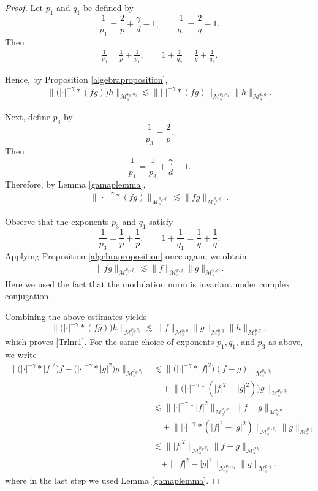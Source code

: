 \documentclass[12pt,reqno,a4paper]{amsart}
\numberwithin{equation}{section}
\theoremstyle{plain}
\theoremstyle{definition}
\theoremstyle{remark}
\def\M{\mathcal{M}}
\def \M{{\mathcal M}}
\begin{document}
\begin{proof}
Let $p_{1}$ and $q_{1}$ be defined by
\[
\frac{1}{p_{1}}
=
\frac{2}{p}
+\frac{\gamma}{d}
-1,
\qquad
\frac{1}{q_{1}}
=
\frac{2}{q}
-1.
\]
Then
\begin{align}
\label{T101}
\frac{1}{p_{0}}
=
\frac{1}{p}
+
\frac{1}{p_{1}},
\qquad
1+\frac{1}{q_{0}}
=
\frac{1}{q}
+
\frac{1}{q_{1}}.
\end{align}

Hence, by Proposition \ref{algebraproposition},
\begin{align*}
\bigl\|
\bigl(|\cdot|^{-\gamma}*(f\overline{g})\bigr)h
\bigr\|_{\M^{p_{0},q_{0}}_{s}}
\lesssim
\bigl\|
|\cdot|^{-\gamma}*(f\overline{g})
\bigr\|_{\M^{p_{1},q_{1}}_{s}}
\|h\|_{\M^{p,q}_{s}}.
\end{align*}

Next, define $p_{3}$ by
\[
\frac{1}{p_{3}}
=
\frac{2}{p}.
\]
Then
\[
\frac{1}{p_{1}}
=
\frac{1}{p_{3}}
+
\frac{\gamma}{d}
-1.
\]
Therefore, by Lemma \ref{gamaplemma},
\begin{align*}
\bigl\|
|\cdot|^{-\gamma}*(f\overline{g})
\bigr\|_{\M^{p_{1},q_{1}}_{s}}
\lesssim
\|f\overline{g}\|_{\M^{p_{3},q_{1}}_{s}}.
\end{align*}

Observe that the exponents $p_{3}$ and $q_{1}$ satisfy
\[
\frac{1}{p_{3}}
=
\frac{1}{p}
+
\frac{1}{p},
\qquad
1+\frac{1}{q_{1}}
=
\frac{1}{q}
+
\frac{1}{q}.
\]
Applying Proposition \ref{algebraproposition} once again, we obtain
\begin{align*}
\|f\overline{g}\|_{\M^{p_{3},q_{1}}_{s}}
\lesssim
\|f\|_{\M^{p,q}_{s}}
\|g\|_{\M^{p,q}_{s}}.
\end{align*}
Here we used the fact that the modulation norm is invariant under
complex conjugation.

Combining the above estimates yields
\[
\bigl\|
\bigl(|\cdot|^{-\gamma}*(f\overline{g})\bigr)h
\bigr\|_{\M^{p_{0},q_{0}}_{s}}
\lesssim
\|f\|_{\M^{p,q}_{s}}
\|g\|_{\M^{p,q}_{s}}
\|h\|_{\M^{p,q}_{s}},
\]
which proves \eqref{Trlnr1}.
For the same choice of exponents $p_{1},q_{1}$, and $p_{3}$ as above, we write
\begin{align}
\label{1}
\bigl\|
\bigl(|\cdot|^{-\gamma}*|f|^{2}\bigr)f
-
\bigl(|\cdot|^{-\gamma}*|g|^{2}\bigr)g
\bigr\|_{\M^{p_{0},q_{0}}_{s}}
&\lesssim
\bigl\|
\bigl(|\cdot|^{-\gamma}*|f|^{2}\bigr)(f-g)
\bigr\|_{\M^{p_{0},q_{0}}_{s}}
\nonumber\\
&\quad+
\bigl\|
\bigl(|\cdot|^{-\gamma}*(|f|^{2}-|g|^{2})\bigr)g
\bigr\|_{\M^{p_{0},q_{0}}_{s}}
\nonumber\\
&\lesssim
\bigl\|
|\cdot|^{-\gamma}*|f|^{2}
\bigr\|_{\M^{p_{1},q_{1}}_{s}}
\|f-g\|_{\M^{p,q}_{s}}
\nonumber\\
&\quad+
\bigl\|
|\cdot|^{-\gamma}*(|f|^{2}-|g|^{2})
\bigr\|_{\M^{p_{1},q_{1}}_{s}}
\|g\|_{\M^{p,q}_{s}}
\nonumber\\
&\lesssim
\||f|^{2}\|_{\M^{p_{3},q_{1}}_{s}}
\|f-g\|_{\M^{p,q}_{s}}
\nonumber\\
&\quad+
\||f|^{2}-|g|^{2}\|_{\M^{p_{3},q_{1}}_{s}}
\|g\|_{\M^{p,q}_{s}}.
\end{align}
where in the last step we used Lemma \ref{gamaplemma}.


\end{proof}
\end{document}
